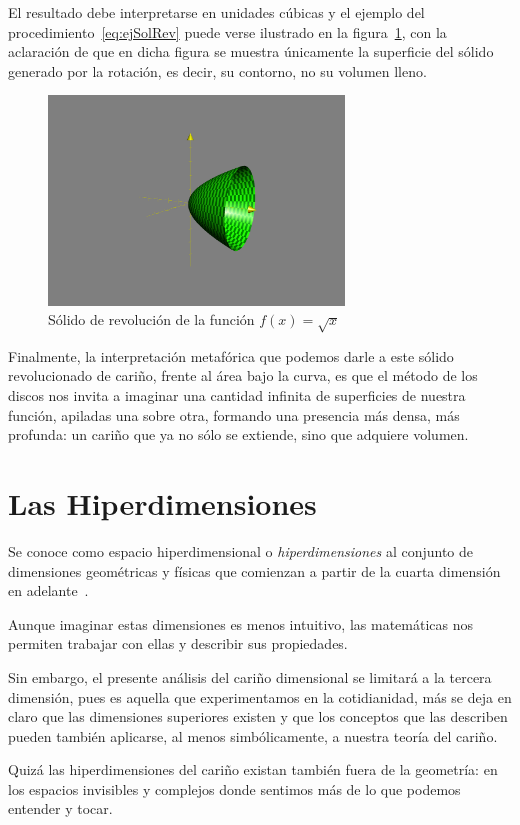 \documentclass[12pt, oneside]{article}
\begin{document}
El resultado debe interpretarse en unidades cúbicas y el ejemplo del procedimiento~\ref{eq:ejSolRev}
puede verse ilustrado en la figura~\ref{fig:grafSolRev}, con la aclaración de que en dicha figura se muestra únicamente la superficie del sólido generado por la rotación, es decir, su contorno, no su volumen lleno.

\begin{figure}[H]
\centering
\includegraphics[width=0.7\textwidth]{grafSolRev.png}
\caption{Sólido de revolución de la función $f(x) = \sqrt{x}$}
\label{fig:grafSolRev} %
\end{figure}

Finalmente, la interpretación metafórica que podemos darle a este sólido revolucionado de cariño, frente al área bajo la curva, es que el método de los discos nos invita a imaginar una cantidad infinita de superficies de nuestra función, apiladas una sobre otra, formando una presencia más densa, más profunda: un cariño que ya no sólo se extiende, sino que adquiere volumen.

\section{Las Hiperdimensiones}
Se conoce como espacio hiperdimensional o \textit{hiperdimensiones} al conjunto de dimensiones geométricas y físicas que comienzan a partir de la cuarta dimensión en adelante~\cite{eswiki:hiperespacio}.

Aunque imaginar estas dimensiones es menos intuitivo, las matemáticas nos permiten trabajar con ellas y describir sus propiedades.

Sin embargo, el presente análisis del cariño dimensional se limitará a la tercera dimensión, pues es aquella que experimentamos en la cotidianidad, más se deja en claro que las dimensiones superiores existen y que los conceptos que las describen pueden también aplicarse, al menos simbólicamente, a nuestra teoría del cariño.

Quizá las hiperdimensiones del cariño existan también fuera de la geometría: en los espacios invisibles y complejos donde sentimos más de lo que podemos entender y tocar.

\newpage

\end{document}
